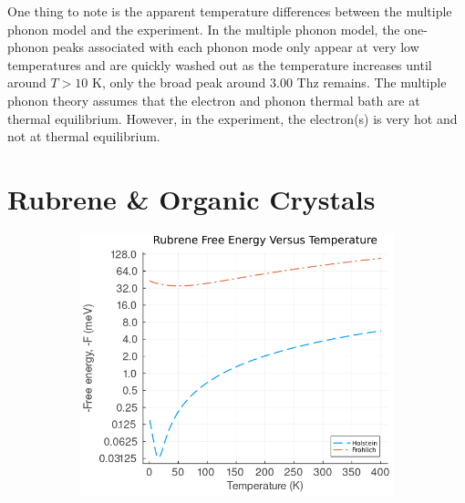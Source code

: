 One thing to note is the apparent temperature differences between the multiple phonon model and the experiment. In the multiple phonon model, the one-phonon peaks associated with each phonon mode only appear at very low temperatures and are quickly washed out as the temperature increases until around $T > 10$ K, only the broad peak around $3.00$ Thz remains. The multiple phonon theory assumes that the electron and phonon thermal bath are at thermal equilibrium. However, in the experiment, the electron(s) is very hot and not at thermal equilibrium.

\section{Rubrene \& Organic Crystals}
\label{sec:chap-sixth-second}

\begin{figure}[!tbp]
    \centering
  \begin{subfigure}[b]{0.49\textwidth}
    \centering
    \includegraphics[width=\textwidth]{figures/rubrene_F_temp.png}
    \label{fig:rubrene_F_temp}
  \end{subfigure}
  \hfill
  \begin{subfigure}[b]{0.49\textwidth}
    \centering

\end{subfigure}
\end{figure}
